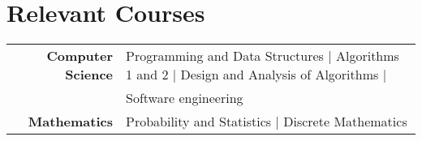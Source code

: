 \documentclass[a4paper,10pt]{article} %
\begin{document}

\section{\textcolor{sectiontitle}{Relevant Courses}}
\begin{tabular}{r|l}
\textbf{Computer Science} & Programming and Data Structures | Algorithms 1 and 2 | Design and Analysis of Algorithms |\\
& Software engineering\\
\textbf{Mathematics} & Probability and Statistics | Discrete  Mathematics\\
\end{tabular}




\end{document}
